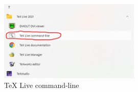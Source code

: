\begin{figure}[htbp] 
	\centering
	\includegraphics[width=0.6\textwidth]{image/chap01/texlivecmd.png}
	\caption{TeX Live command-line}
	\label{fig:texlivecmd}
\end{figure}
